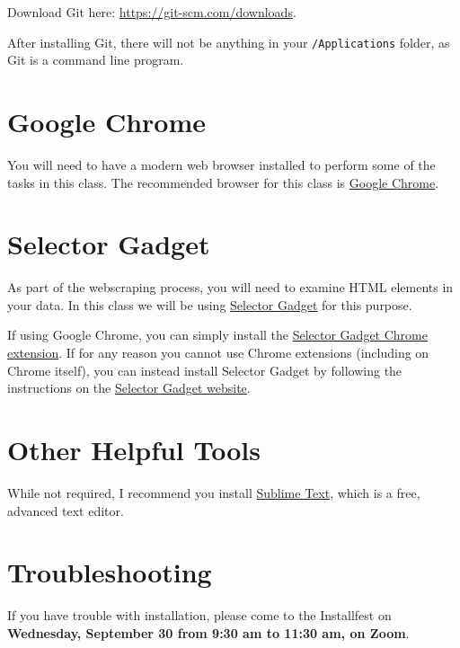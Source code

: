 \documentclass[
]{book}
\begin{document}
Download Git here: \url{https://git-scm.com/downloads}.

After installing Git, there will not be anything in your \texttt{/Applications} folder, as Git is a command line program.

\hypertarget{google-chrome}{%
\section{Google Chrome}\label{google-chrome}}

You will need to have a modern web browser installed to perform some of the tasks in this class. The recommended browser for this class is \href{https://www.google.co.uk/intl/en_uk/chrome/}{Google Chrome}.

\hypertarget{selector-gadget}{%
\section{Selector Gadget}\label{selector-gadget}}

As part of the webscraping process, you will need to examine HTML elements in your data. In this class we will be using \href{https://selectorgadget.com/}{Selector Gadget} for this purpose.

If using Google Chrome, you can simply install the \href{https://chrome.google.com/webstore/detail/selectorgadget/mhjhnkcfbdhnjickkkdbjoemdmbfginb?hl=en}{Selector Gadget Chrome extension}. If for any reason you cannot use Chrome extensions (including on Chrome itself), you can instead install Selector Gadget by following the instructions on the \href{https://selectorgadget.com/}{Selector Gadget website}.

\hypertarget{other-helpful-tools}{%
\section{Other Helpful Tools}\label{other-helpful-tools}}

While not required, I recommend you install \href{https://www.sublimetext.com/3}{Sublime Text}, which is a free, advanced text editor.

\hypertarget{troubleshooting}{%
\section{Troubleshooting}\label{troubleshooting}}

If you have trouble with installation, please come to the Installfest on \textbf{Wednesday, September 30 from 9:30 am to 11:30 am, on Zoom}.
\end{document}
